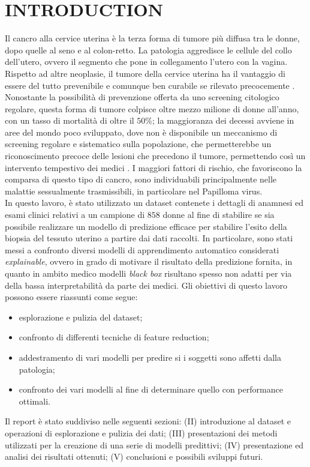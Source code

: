 \section{INTRODUCTION}
Il cancro alla cervice uterina è la terza forma di tumore più diffusa tra le donne, dopo quelle al seno e al colon-retto. La patologia aggredisce le cellule del collo dell’utero, ovvero il segmento che pone in collegamento l’utero con la vagina. Rispetto ad altre neoplasie, il tumore della cervice uterina ha il vantaggio di essere del tutto prevenibile e comunque ben curabile se rilevato precocemente \cite{veronesi}.
Nonostante la possibilità di prevenzione offerta da uno screening citologico regolare, questa forma di tumore colpisce oltre mezzo milione di donne all'anno, con un tasso di mortalità di oltre il $50\%$; la maggioranza dei decessi avviene in aree del mondo poco sviluppato, dove non è disponibile un meccanismo di screening regolare e sistematico sulla popolazione, che permetterebbe un riconoscimento precoce delle lesioni che precedono il tumore, permettendo così un intervento tempestivo dei medici \cite{paper}.
I maggiori fattori di rischio, che favoriscono la comparsa di questo tipo di cancro, sono individuabili principalmente nelle malattie sessualmente trasmissibili, in particolare nel Papilloma virus.\\
In questo lavoro, è stato utilizzato un dataset contenete i dettagli di anamnesi ed esami clinici relativi a un campione di $858$ donne al fine di stabilire se sia possibile realizzare un modello di predizione efficace per stabilire l'esito della biopsia del tessuto uterino a partire dai dati raccolti.
In particolare, sono stati messi a confronto diversi modelli di apprendimento automatico considerati \textit{explainable}, ovvero in grado di motivare il risultato della predizione fornita, in quanto in ambito medico modelli \textit{black box} risultano spesso non adatti per via della bassa interpretabilità da parte dei medici.
Gli obiettivi di questo lavoro possono essere riassunti come segue:
\begin{itemize}
	\item esplorazione e pulizia del dataset;
	\item confronto di differenti tecniche di feature reduction;
	\item addestramento di vari modelli per predire si i soggetti sono affetti dalla patologia;
	\item confronto dei vari modelli al fine di determinare quello con performance ottimali.
\end{itemize}
Il report è stato suddiviso nelle seguenti sezioni: (II) introduzione al dataset e operazioni di esplorazione e pulizia dei dati; (III) presentazioni dei metodi utilizzati per la creazione di una serie di modelli predittivi; (IV) presentazione ed analisi dei risultati ottenuti; (V) conclusioni e possibili sviluppi futuri.